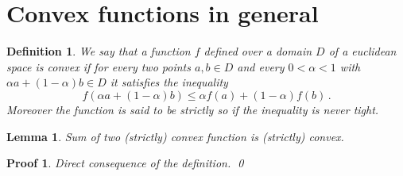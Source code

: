 \documentclass[12pt]{book}
\newtheorem{definition}{Definition}
\newtheorem{lemma}{Lemma}
\newtheorem*{pf}{Proof}
\begin{document}
\section{Convex functions in general}

\begin{definition}
    We say that a function $f$ defined over a domain $D$ of a euclidean space
        is \emph{convex} if for every two points $a,b\in D$ and every $0<
        \alpha<1$ with $\alpha a + (1-\alpha) b \in D$ it satisfies the
        inequality 
        \begin{equation*}
            f(\alpha a + (1-\alpha) b)
            \le
            \alpha f(a) + (1-\alpha) f(b)\,.
        \end{equation*}
    Moreover the function is said to be \emph{strictly} so if the inequality
        is never tight.
\end{definition}

\begin{lemma}
    Sum of two (strictly) convex function is (strictly) convex.
\end{lemma}
\begin{pf}
    Direct consequence of the definition.
    \qed
\end{pf}
\end{document}
